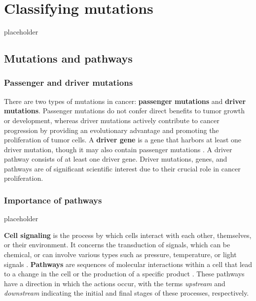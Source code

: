 \chapter{Classifying mutations} \label{chap:classifying_mutations}

placeholder 

\section{Mutations and pathways}

\subsection{Passenger and driver mutations}

There are two types of mutations in cancer: \textbf{passenger mutations} and \textbf{driver mutations}. Passenger mutations do not confer direct benefits to tumor growth or development, whereas driver mutations actively contribute to cancer progression by providing an evolutionary advantage and promoting the proliferation of tumor cells. A \textbf{driver gene} is a gene that harbors at least one driver mutation, though it may also contain passenger mutations . A driver pathway consists of at least one driver gene. Driver mutations, genes, and pathways are of significant scientific interest due to their crucial role in cancer proliferation. 

\subsection{Importance of pathways}

placeholder 

\textbf{Cell signaling} is the process by which cells interact with each other, themselves, or their environment. It concerns the transduction of signals, which can be chemical, or can involve various types such as pressure, temperature, or light signals \cite{cell_signaling}. \textbf{Pathways} are sequences of molecular interactions within a cell that lead to a change in the cell or the production of a specific product \cite{pathway}. These pathways have a direction in which the actions occur, with the terms \textit{upstream} and \textit{downstream} indicating the initial and final stages of these processes, respectively.

